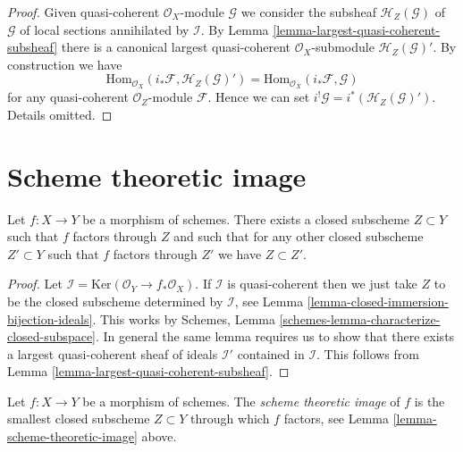 \begin{proof}
Given quasi-coherent $\mathcal{O}_X$-module $\mathcal{G}$ we consider
the subsheaf $\mathcal{H}_Z(\mathcal{G})$ of $\mathcal{G}$ of local sections
annihilated by $\mathcal{I}$. By
Lemma \ref{lemma-largest-quasi-coherent-subsheaf}
there is a canonical largest quasi-coherent $\mathcal{O}_X$-submodule
$\mathcal{H}_Z(\mathcal{G})'$. By construction we have
$$
\text{Hom}_{\mathcal{O}_X}(i_*\mathcal{F}, \mathcal{H}_Z(\mathcal{G})')
=
\text{Hom}_{\mathcal{O}_X}(i_*\mathcal{F}, \mathcal{G})
$$
for any quasi-coherent $\mathcal{O}_Z$-module $\mathcal{F}$.
Hence we can set $i^!\mathcal{G} = i^*(\mathcal{H}_Z(\mathcal{G})')$.
Details omitted.
\end{proof}












\section{Scheme theoretic image}
\label{section-scheme-theoretic-image}

\begin{lemma}
\label{lemma-scheme-theoretic-image}
Let $f : X \to Y$ be a morphism of schemes. There exists a closed
subscheme $Z \subset Y$ such that $f$ factors through $Z$ and such
that for any other closed subscheme $Z' \subset Y$ such that $f$
factors through $Z'$ we have $Z \subset Z'$.
\end{lemma}

\begin{proof}
Let $\mathcal{I} = \text{Ker}(\mathcal{O}_Y \to f_*\mathcal{O}_X)$.
If $\mathcal{I}$ is quasi-coherent then we just take $Z$ to be the
closed subscheme determined by $\mathcal{I}$, see
Lemma \ref{lemma-closed-immersion-bijection-ideals}. This works by
Schemes, Lemma \ref{schemes-lemma-characterize-closed-subspace}.
In general the same lemma requires us to show that there exists
a largest quasi-coherent sheaf of ideals $\mathcal{I}'$ contained in
$\mathcal{I}$.
This follows from Lemma \ref{lemma-largest-quasi-coherent-subsheaf}.
\end{proof}

\begin{definition}
\label{definition-scheme-theoretic-image}
Let $f : X \to Y$ be a morphism of schemes. The {\it scheme theoretic image}
of $f$ is the smallest closed subscheme $Z \subset Y$ through which $f$
factors, see Lemma \ref{lemma-scheme-theoretic-image} above.
\end{definition}


